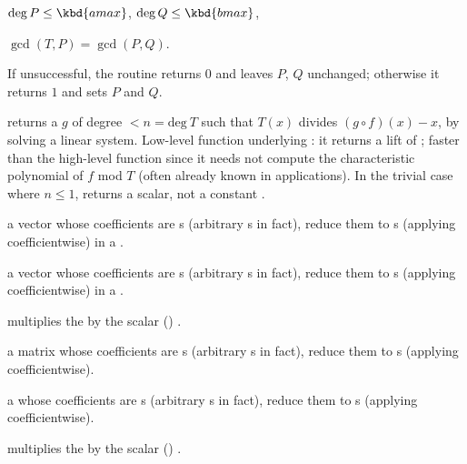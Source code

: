 \item $\deg P \leq \kbd{amax}$, $\deg Q \leq \kbd{bmax}$,

\item $\gcd(T,P) = \gcd(P,Q)$.

\noindent If unsuccessful, the routine returns $0$ and leaves $P$, $Q$
unchanged; otherwise it returns $1$ and sets $P$ and $Q$.

 returns a  $g$ of degree $< n
= \text{deg}~T$ such that $T(x)$ divides $(g \circ f)(x) - x$, by solving a
linear system. Low-level function underlying : it returns a
lift of \kbd[modreverse(f,T)]; faster than the high-level function since it
needs not compute the characteristic polynomial of $f$ mod $T$ (often already
known in applications). In the trivial case where $n \leq 1$, returns a
scalar, not a constant .


  a vector whose
coefficients are s (arbitrary s in fact), reduce them to
s (applying  coefficientwise) in a .

  a vector whose
coefficients are s (arbitrary s in fact), reduce them to
s (applying  coefficientwise) in a .

  multiplies the
   by the scalar () .


  a matrix whose
coefficients are s (arbitrary s in fact), reduce them to
s (applying  coefficientwise).



  a  whose
coefficients are s (arbitrary s in fact), reduce them to
s (applying  coefficientwise).


 multiplies the 
 by the scalar () .


